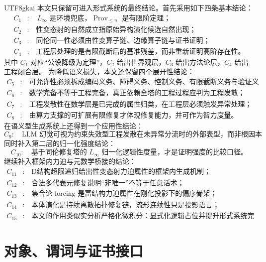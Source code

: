 \documentclass[12pt]{article}
\newcommand{\Linfty}{\ensuremath{L_\infty}}
\newcommand{\Prov}{\operatorname{Prov}}
\begin{document}
\begin{CJK*}{UTF8}{gkai}
本文只保留可进入形式系统的最终结论。首先采用如下四条基本结论：
\[
\begin{aligned}
  C_1&:\quad
  \Linfty\text{ 是环境兜底，}
  \Prov_{\le n}\text{ 是有限阶定理；}\\
  C_2&:\quad
  \text{性变态射的自然成立指原始异构演化候选自然出现；}\\
  C_3&:\quad
  \text{同伦同一性必须由性变算子链、边缘算子链与证书证明；}\\
  C_4&:\quad
  \text{工程层处理的是有限截断后的基准残差，而非重新证明高阶存在性。}
\end{aligned}
\]
其中 $C_1$ 对应“公设降级为定理”，$C_2$ 给出世界观层，$C_3$ 给出方法论层，$C_4$ 给出工程闭合层。
为降低语义损失，本文还保留四个展开性结论：
\[
\begin{aligned}
  C_5&:\quad
  \text{可允许性必须拆成编码义务、障碍义务、控制义务、有限截断义务与验证义务；}\\
  C_6&:\quad
  \text{数学完备不等于工程完备，真正依赖全塔的工程过程应判为工程发散；}\\
  C_7&:\quad
  \text{工程发散性在数学层是已完成的属性归类，在工程层必须触发异常处理；}\\
  C_8&:\quad
  \text{由算力支撑的可扩展有限修复才体现修复能力，并可作为智力度量。}
\end{aligned}
\]
在语义型生成系统上还得到一个应用性结论：
\[
  C_9:\quad
  \text{LLM 幻觉可视为约束失效型工程发散在未异常分流时的外部表型，而非根因本身。}
\]
同时补入第二层的归一化强度结论：
\[
  C_{10}:\quad
  \text{基于同伦修复塔的 }\Linfty\text{ 归一化逻辑性度量，才是证明强度的比较口径。}
\]
继续补入框架内力迫与元数学桥接的结论：
\[
\begin{aligned}
  C_{11}&:\quad
  \text{D结构超限递归给出性变态射力迫属性的框架内生成机制；}\\
  C_{12}&:\quad
  \text{合法多代表元修复说明“非唯一”不等于任意话术；}\\
  C_{13}&:\quad
  \text{集合论 forcing 是富结构力迫属性在刚化投影下的偏序骨架；}\\
  C_{14}&:\quad
  \text{本体演化是持续离散拓扑修复链，流形连续性只是投影语言；}\\
  C_{15}&:\quad
  \text{本文的作用类似实分析严格化微积分：显式化逻辑占位并提升形式系统完备度。}
\end{aligned}
\]

\clearpage

\section{对象、谓词与证书接口}
\label{sec:tex50-objects}


\end{CJK*}
\end{document}
